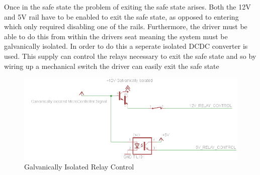 Once in the safe state the problem of exiting the safe state arises. Both the 12V and 5V rail have to be enabled to exit the safe state, as opposed to entering which only required disabling one of the rails. Furthermore, the driver must be able to do this from within the drivers seat meaning the system must be galvanically isolated. In order to do this a seperate isolated DCDC converter is used. This supply can control the relays necessary to exit the safe state and so by wiring up a mechanical switch the driver can easily exit the safe state

\begin{figure}[H]
\includegraphics[width=\columnwidth]{figures/SafeStateIsolated.png}%
\caption{Galvanically Isolated Relay Control}
\label{Fig:IsolatedControl}
\end{figure}
